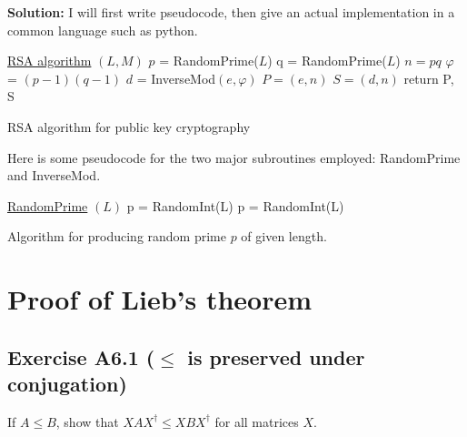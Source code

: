 \documentclass{book}
\begin{document}
    \textbf{Solution:} I will first write pseudocode, then give an actual implementation in a common language such as python.
    \begin{algorithm}
        
        \underline{RSA algorithm} $(L,M)$\;
        $p$ = RandomPrime($L$)\;
        q = RandomPrime($L$)\;
        $n = pq$\;
        $\varphi$ = $(p-1)(q-1)$\;
        $d$ = InverseMod$(e, \varphi)$\;
        $P = (e, n)$\;
        $S= (d,n)$\;
        return P, S
        \caption{RSA algorithm for public key cryptography}
    \end{algorithm}
    Here is some pseudocode for the two major subroutines employed: RandomPrime and InverseMod.
    \begin{algorithm}
        \underline{RandomPrime} $(L)$\;
        p = RandomInt(L)\;
            {
            p = RandomInt(L)\;
            }
        \caption{Algorithm for producing random prime $p$ of given length.}
    \end{algorithm}


\chapter{Proof of Lieb's theorem}


\section*{Exercise A6.1 ($\leq$ is preserved under conjugation)}
    If $A\leq B$, show that $XAX^\dagger \leq XBX^\dagger$ for all matrices $X$.
    
\end{document}
